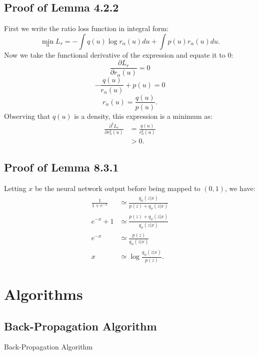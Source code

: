 \documentclass[honours,12pt]{unswthesis}
\numberwithin{equation}{section}
\theoremstyle{definition}
\begin{document}
\section{Proof of Lemma 4.2.2}\label{app:A.4}
First we write the ratio loss function in integral form:
\[\min_\alpha L_r=-\int q(u)\log r_\alpha(u)du+\int p(u)r_\alpha(u)du.\]
Now we take the functional derivative of the expression and equate it to 0:
\[\frac{\partial L_r}{\partial r_\alpha(u)}=0\]
\[-\frac{q(u)}{r_\alpha (u)}+p(u)=0\]
\[r_\alpha(u)=\frac{q(u)}{p(u)}.\]
Observing that $q(u)$ is a density, this expression is a minimum as:
\begin{align*}
\frac{\partial^2L_r}{\partial r_\alpha^2(u)}&=\frac{q(u)}{r_\alpha^2(u)}\\
&>0.
\end{align*}
\section{Proof of Lemma 8.3.1}\label{app:A.5}
Letting $x$ be the neural network output before being mapped to $(0,1)$, we have:
\begin{align*}
\frac{1}{1+e^{-x}}&\simeq\frac{q_\phi(z|x)}{p(z)+q_\phi(z|x)}\\
e^{-x}+1&\simeq\frac{p(z)+q_\phi(z|x)}{q_\phi(z|x)}\\
e^{-x}&\simeq\frac{p(z)}{q_\phi(z|x)}\\
x&\simeq\log \frac{q_\phi(z|x)}{p(z)}.
\end{align*}
\chapter{Algorithms}\label{app:B}
\section{Back-Propagation Algorithm}\label{app:B.1}
\begin{algorithm}
\caption{Back-Propagation Algorithm}
\BlankLine
{}
\label{alg:5}
\end{algorithm}
\newpage
\end{document}

